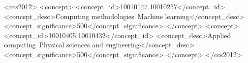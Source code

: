 \documentclass[sigconf]{acmart}
\begin{document}
%
%
\begin{CCSXML}
<ccs2012>
<concept>
<concept_id>10010147.10010257</concept_id>
<concept_desc>Computing methodologies~Machine learning</concept_desc>
<concept_significance>500</concept_significance>
</concept>
<concept>
<concept_id>10010405.10010432</concept_id>
<concept_desc>Applied computing~Physical sciences and engineering</concept_desc>
<concept_significance>500</concept_significance>
</concept>
</ccs2012>
\end{CCSXML}





\maketitle



%

%

\end{document}
